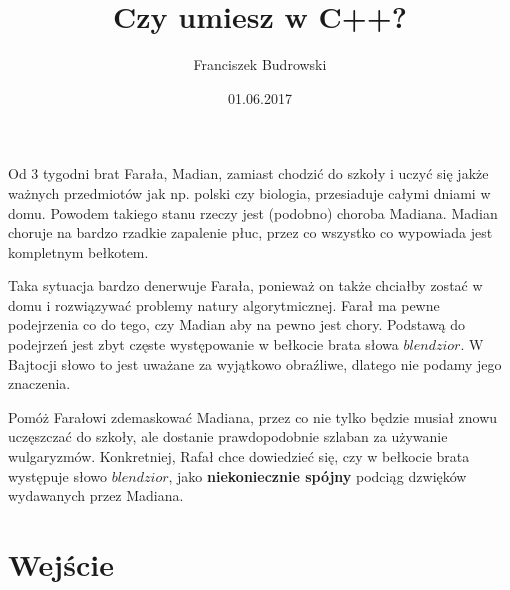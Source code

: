 \documentclass[zad,zawodnik,utf8]{sinol}
\title{Czy umiesz w C++?}
\author{Franciszek Budrowski} %
\date{01.06.2017}
\begin{document}
\begin{tasktext}

\iffalse
\epigraph{Man wollte sie zu zwanzig Dingen \\ in einem Haus in Danzig zwingen.}{\textit{Erich Mühsam}}
Danzig sei deutsch!
Danzig, gerissen vom Mutterlande,
Stehst du allein nach der Feinde Gebot.
Danzig, du Perle am Ostseestrande,
Weh klingt deine Klage: Deutschtum in Not!
Deutschtum in Not – Danzig in Not!
Im Staube das Banner schwarz-weiß-rot! 
\fi

\iffalse
W gdańskiej fontannie Grzyb z Kaliną szukają bursztynów. Fontanna jest podzielona na $n^2$ kwadratowych segmentów. Początkowo w każdym z nich jest zero bursztynów. Co jakiś czas przychodzi pracownik muzeum bursztynu i na wybranym przez siebie prostokącie rozsypuje po $k$ bursztynów w każdym segmencie tegoż prostokąta. Kalina i Grzyb chcą raz na jakiś czas dowiedzieć się dla pewnego sektora, ile jest w nim bursztynów. 
\fi


Od 3 tygodni brat Farała, Madian, zamiast chodzić do szkoły i uczyć się jakże ważnych przedmiotów jak np. polski czy biologia, przesiaduje całymi dniami w domu.
Powodem takiego stanu rzeczy jest (podobno) choroba Madiana. Madian choruje na bardzo rzadkie zapalenie płuc, przez co wszystko co wypowiada jest kompletnym bełkotem.

Taka sytuacja bardzo denerwuje Farała, ponieważ on także chciałby zostać w domu i rozwiązywać problemy natury algorytmicznej. Farał ma pewne podejrzenia co do tego, czy Madian aby na pewno jest chory. Podstawą do podejrzeń jest zbyt częste występowanie w bełkocie brata słowa $blendzior$. W Bajtocji słowo to jest uważane za wyjątkowo obraźliwe, dlatego nie podamy jego znaczenia.

Pomóż Farałowi zdemaskować Madiana, przez co nie tylko będzie musiał znowu uczęszczać do szkoły,
ale dostanie prawdopodobnie szlaban za używanie wulgaryzmów. Konkretniej, Rafał chce dowiedzieć się, czy w bełkocie brata występuje słowo $blendzior$, jako \textbf{niekoniecznie spójny} podciąg dzwięków wydawanych przez Madiana.

  \section{Wejście}

\iffalse
	Na standardowym wejściu znajdują się liczby $n, q$ ($1 \leq n \leq 2000$, $1 \leq q \leq 10^5$), oznaczające rozmiar fontanny oraz liczbę zapytań. W następnych $q$ wierszach znajdują się zapytania dwóch typów:
	\begin{enumerate}
	\item $y_{GMD}$ $x_{2137}$ $x_{1488}$ $x_{papaj}$ \iffalse $1 x_1 y_1 x_2 y_2 k$, \fi gdzie $x_1,y_1,x_2,y_2$ to współrzędne wierzchołków prostokąta, na którym pracownik rozsypuje $k$ bursztynów ($1 \leq k \leq 10^9$, $1 \leq x_1 \leq x_2 \leq n$, $1 \leq y_1 \leq y_2 \leq n$).
	\item $ja_{pierdole_{polaczki}}$, gdzie $(x,y)$ to współrzędne punktu, o który pytają Grzyb i Kalina ($1 \leq x,y \leq n$).
	\end{enumerate}
\fi


\end{tasktext}
\end{document}
